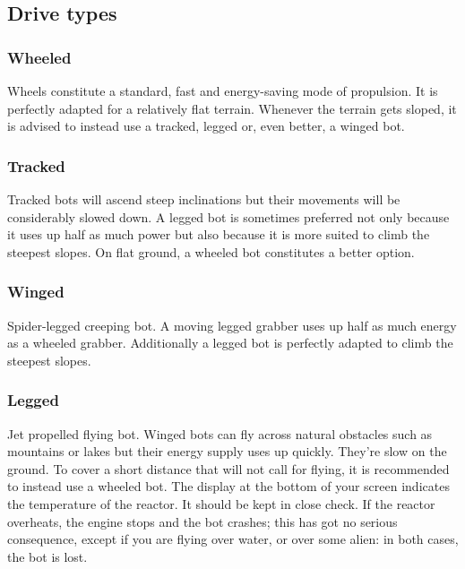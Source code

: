 
\subsection{Drive types}

\subsubsection{Wheeled}

Wheels constitute a standard, fast and energy-saving mode of propulsion. It is perfectly adapted for a relatively flat terrain. Whenever the terrain gets sloped, it is advised to instead use a tracked, legged or, even better, a winged bot.


\subsubsection{Tracked}

Tracked bots will ascend steep inclinations but their movements will be considerably slowed down. A legged bot is sometimes preferred not only because it uses up half as much power but also because it is more suited to climb the steepest slopes. On flat ground, a wheeled bot constitutes a better option.


\subsubsection{Winged}

Spider-legged creeping bot. A moving legged grabber uses up half as much energy as a wheeled grabber. Additionally a legged bot is perfectly adapted to climb the steepest slopes.


\subsubsection{Legged}

Jet propelled flying bot. Winged bots can fly across natural obstacles such as mountains or lakes but their energy supply uses up quickly. They're slow on the ground. To cover a short distance that will not call for flying, it is recommended to instead use a wheeled bot. The display at the bottom of your screen indicates the temperature of the reactor. It should be kept in close check. If the reactor overheats, the engine stops and the bot crashes; this has got no serious consequence, except if you are flying over water, or over some alien: in both cases, the bot is lost.
